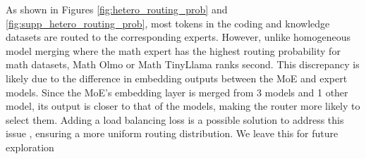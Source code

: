 
As shown in Figures \ref{fig:hetero_routing_prob} and \ref{fig:supp_hetero_routing_prob}, most tokens in the coding and knowledge datasets are routed to the corresponding experts. However, unlike homogeneous model merging where the math expert has the highest routing probability for math datasets, Math Olmo or Math TinyLlama ranks second. This discrepancy is likely due to the difference in embedding outputs between the MoE and expert models. Since the MoE's embedding layer is merged from 3 \llama models and 1 other model, its output is closer to that of the \llama models, making the router more likely to select them. Adding a load balancing loss is a possible solution to address this issue \cite{sukhbaatar2024branchtrainmixmixingexpertllms, fedus2022switch}, ensuring a more uniform routing distribution. We leave this for future exploration